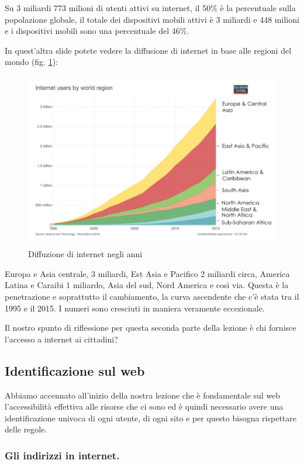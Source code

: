 Su 3 miliardi 773 milioni di utenti attivi su internet, il 50\% è la percentuale sulla popolazione globale, il totale dei dispositivi mobili attivi è 3 miliardi e 448 milioni e i dispositivi mobili sono una percentuale del 46\%. 

In quest'altra slide potete vedere la diffusione di internet in base alle regioni del mondo (fig. \ref{fig:diffusione_internet}):
\begin{figure}[ht]
    \centering
    \includegraphics[width=0.9\linewidth]{images/03_lez_fig_06.jpg}
    \caption{Diffuzione di internet negli anni}
    \label{fig:diffusione_internet}
\end{figure}


Europa e Asia centrale, 3 miliardi, Est Asia e Pacifico 2 miliardi circa, America Latina e Caraibi 1 miliardo, Asia del sud, Nord America e così via. Questa è la penetrazione e soprattutto il cambiamento, la curva ascendente che c'è stata tra il 1995 e il 2015. I numeri sono cresciuti in maniera veramente eccezionale. 

Il nostro spunto di riflessione per questa seconda parte della lezione è chi fornisce l'accesso a internet ai cittadini?

\subsection{Identificazione sul web}

Abbiamo accennato all'inizio della nostra lezione che è fondamentale sul web l'accessibilità effettiva alle risorse che ci sono ed è quindi necessario avere una identificazione univoca di ogni utente, di ogni sito e  per questo bisogna rispettare delle regole.

\subsubsection{Gli indirizzi in internet.}

